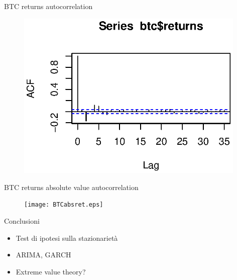 \documentclass{beamer}
\begin{document}
\begin{frame}{BTC returns autocorrelation}
	\begin{figure}[linewidth=250mm]	
		\includegraphics[width=110mm]{BTCautocor.eps}
	\end{figure}
\end{frame}


\begin{frame}{BTC returns absolute value autocorrelation}
	\begin{figure}[b]	
		\texttt{[image: BTCabsret.eps]}
	\end{figure}
\end{frame}

%

\begin{frame}{Conclusioni}
	\begin{itemize}
		\item Test di ipotesi sulla stazionarietà
		\item ARIMA, GARCH
		\item Extreme value theory?
	\end{itemize}
\end{frame}
\end{document}
